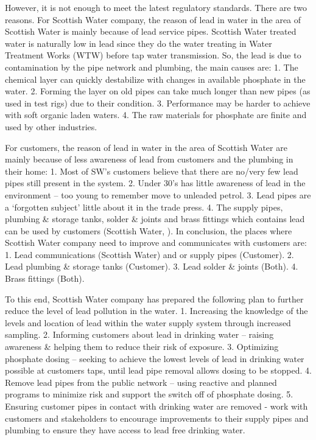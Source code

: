 \documentclass[11pt,twoside]{article}
\numberwithin{Theorem}{section}
\numberwithin{Definition}{section}
\numberwithin{Lemma}{section}
\numberwithin{Algorithm}{section}
\numberwithin{equation}{section}
\begin{document}
However, it is not enough to meet the latest regulatory standards. There are two reasons.
For Scottish Water company, the reason of lead in water in the area of Scottish Water is mainly because of lead service pipes. Scottish Water treated water is naturally low in lead since they do the water treating in Water Treatment Works (WTW) before tap water transmission. So, the lead is due to contamination by the pipe network and plumbing, the main causes are: 1. The chemical layer can quickly destabilize with changes in available phosphate in the water. 2. Forming the layer on old pipes can take much longer than new pipes (as used in test rigs) due to their condition. 3. Performance may be harder to achieve with soft organic laden waters. 4. The raw materials for phosphate are finite and used by other industries.

For customers, the reason of lead in water in the area of Scottish Water are mainly because of less awareness of lead from customers and the plumbing in their home: 1. Most of SW’s customers believe that there are no/very few lead pipes still present in the system. 2. Under 30’s has little awareness of lead in the environment – too young to remember move to unleaded petrol. 3. Lead pipes are a ‘forgotten subject’ little about it in the trade press. 4. The supply pipes, plumbing \& storage tanks, solder \& joints and brass fittings which contains lead can be used by customers (Scottish Water, \citeyear{sw2}).
In conclusion, the places where Scottish Water company need to improve and communicates with customers are: 1. Lead communications (Scottish Water) and or supply pipes (Customer). 2. Lead plumbing \& storage tanks (Customer). 3. Lead solder \& joints (Both). 4. Brass fittings (Both).

To this end, Scottish Water company has prepared the following plan to further reduce the level of lead pollution in the water. 1. Increasing the knowledge of the levels and location of lead within the water supply system through increased sampling. 2. Informing customers about lead in drinking water – raising awareness \& helping them to reduce their risk of exposure. 3. Optimizing phosphate dosing – seeking to achieve the lowest levels of lead in drinking water possible at customers taps, until lead pipe removal allows dosing to be stopped. 4. Remove lead pipes from the public network – using reactive and planned programs to minimize risk and support the switch off of phosphate dosing. 5. Ensuring customer pipes in contact with drinking water are removed - work with customers and stakeholders to encourage improvements to their supply pipes and plumbing to ensure they have access to lead free drinking water.
\end{document}
